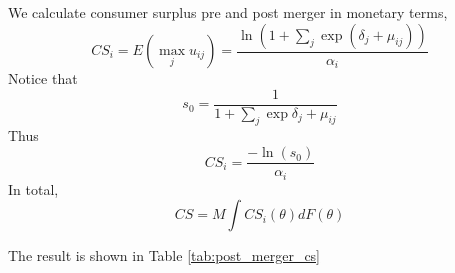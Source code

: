 \documentclass[12pt]{article}
\begin{document}
We calculate consumer surplus pre and post merger in monetary terms, $$CS_i =
    E(\max_j u_{ij})= \frac{\ln(1+\sum_j \exp(\delta_j+\mu_{ij}))}{\alpha_i}$$
Notice that $$s_0=\frac{1}{1+\sum_j \exp\delta_j+\mu_{ij}}$$ Thus
$$CS_i=\frac{-\ln(s_0)}{\alpha_i}$$ In total, $$ CS = M\int
    CS_i(\theta)dF(\theta)$$

The result is shown in Table \ref{tab:post_merger_cs}






%         
\end{document}
